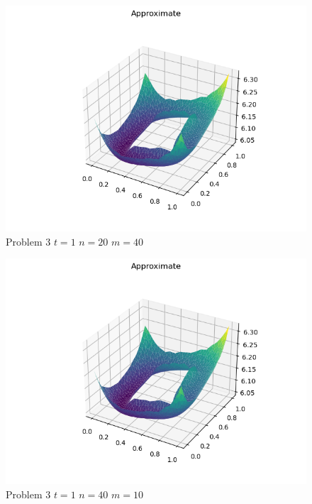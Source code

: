 \documentclass{report}
\begin{document}
\begin{figure}[h]
	\caption{Problem 3 $t = 1$ $n = 20$ $m = 40$}
	\includegraphics[width=\textwidth]{example.png}
\end{figure}
\begin{figure}[h]
	\caption{Problem 3 $t = 1$ $n = 40$ $m = 10$}
	\includegraphics[width=\textwidth]{example.png}
\end{figure}
\end{document}
